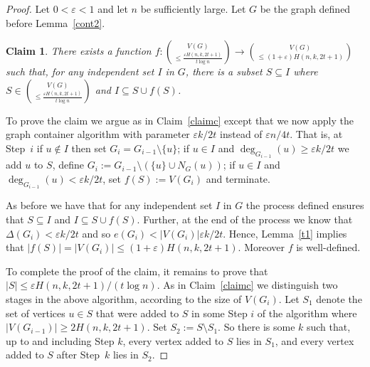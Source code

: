 \documentclass[11pt]{article}
\newtheorem{claim}[theorem]{Claim}
\numberwithin{equation}{section}
\def\eps{\varepsilon}
\begin{document}
\begin{proof}
Let $0< \eps <1$ and let $n$  be sufficiently large. Let $G$ be the graph  defined before Lemma~\ref{cont2}.

\begin{claim}\label{claimt}
There exists a function $f : \binom{V(G)}{\leq \frac{\eps H(n,k,2t+1)}{t\log n}} \to \binom{V(G)}{\leq (1+\eps)H(n,k,2t+1)}$  such that, for any independent set $I$ in $G$, there is a subset $S \subseteq I$ where 
$S \in \binom{V(G)}{\leq \frac{\eps H(n,k,2t+1)}{t\log n}} $
 and   $I \subseteq S \cup f(S)$. 
\end{claim}
To prove the claim we argue as in Claim~\ref{claimc} except that we now apply the graph container algorithm with parameter $\eps k/2t$ instead of $\eps n/4t$. That is, at Step~$i$ if $u\notin I$ then set $G_i=G_{i-1}\setminus \{u\}$;
 if $u \in I$ and $\deg_{G_{i-1}}(u) \geq \eps {k}/{2t}$ we add $u$ to $S$, define $G_i := G_{i-1} \setminus (\{u\} \cup N_G(u))$; if $u \in I$ and $\deg_{G_{i-1}}(u) <  \eps {k}/{2t}$, set $f(S) := V(G_i)$ and terminate.

As before we have that for any independent set $I $ in $G$ the process defined ensures that $S \subseteq I$  and $I \subseteq S \cup f(S)$. Further, at the end of the process we know that
$\Delta (G_i) < \eps {k}/{2t}$ and so $e(G_i)< |V(G_i)| \eps {k}/{2t}$. Hence, Lemma~\ref{t1} implies that $|f(S)|=|V(G_i)|\leq (1+\eps)H(n,k,2t+1)$. Moreover $f$ is well-defined.


To complete the proof of the claim, it 
remains to prove that $|S|\leq \eps {H(n,k,2t+1)}/({t\log n})$.
As in Claim~\ref{claimc} we distinguish two stages in the above algorithm, according to the size of $V(G_i)$. Let $S_1$ denote the set of vertices $u \in S$ that were added to $S$ in some Step $i$ of the algorithm where $|V(G_{i-1})|\geq 2 H(n,k,2t+1)$. Set $S_2 :=S \setminus S_1$.
So there is some $k$ such that, up to and including Step $k$, every vertex added to $S$ lies in $S_1$, and every vertex added to $S$ after Step~$k$ lies in $S_2$.


\end{proof}
\end{document}
